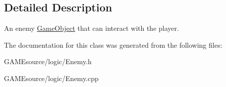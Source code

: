 \subsection{Detailed Description}
An enemy \mbox{\hyperlink{class_game_object}{Game\+Object}} that can interact with the player. 

The documentation for this class was generated from the following files\+:\begin{DoxyCompactItemize}
\item 
G\+A\+M\+Esource/logic/Enemy.\+h\item 
G\+A\+M\+Esource/logic/Enemy.\+cpp\end{DoxyCompactItemize}
